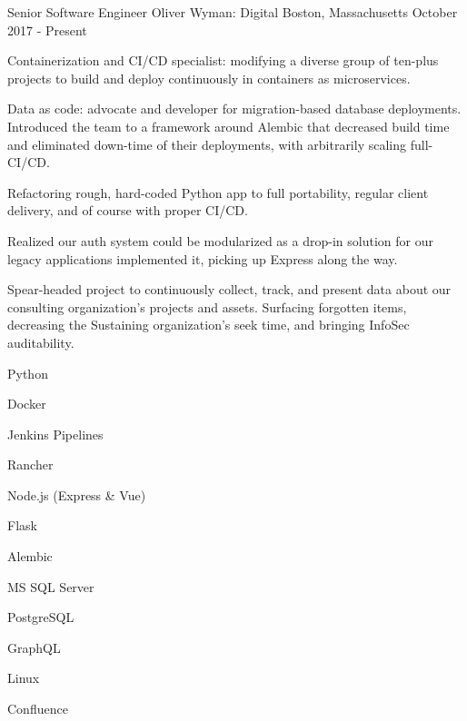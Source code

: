 

\begin{cventries}

  \cventry
    {Senior Software Engineer} %
    {Oliver Wyman: Digital} %
    {Boston, Massachusetts} %
    {October 2017 - Present} %
    {%
      \begin{cvitems} %
        \item Containerization and CI/CD specialist: modifying a diverse group of ten-plus projects to build and deploy continuously in containers as microservices.
        \item Data as code: advocate and developer for migration-based database deployments. Introduced the team to a framework around Alembic that decreased build time and eliminated down-time of their deployments, with arbitrarily scaling full-CI/CD\@.
        \item Refactoring rough, hard-coded Python app to full portability, regular client delivery, and of course with proper CI/CD\@.
        \item Realized our auth system could be modularized as a drop-in solution for our legacy applications \- implemented it, picking up Express along the way.
        \item Spear-headed project to continuously collect, track, and present data about our consulting organization's projects and assets. Surfacing forgotten items, decreasing the Sustaining organization's seek time, and bringing InfoSec auditability.
      \end{cvitems}
    }
    \begin{cventryskills}
      \item Python
      \item Docker
      \item Jenkins Pipelines
      \item Rancher
      \item Node.js (Express \& Vue)
      \item Flask
      \item Alembic
      \item MS SQL Server
      \item PostgreSQL
      \item GraphQL
      \item Linux
      \item Confluence
    \end{cventryskills}


\end{cventries}
